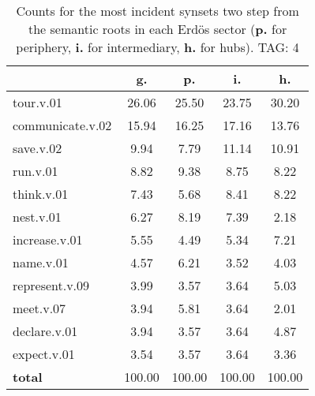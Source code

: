 \begin{table}[h!]
\begin{center}
\begin{tabular}{| l || c | c | c | c |}\hline
 & {\bf g.} & {\bf p.} & {\bf i.} & {\bf h.} \\\hline\hline
tour.v.01 & 26.06  & 25.50  & 23.75  & 30.20 \\\hline
communicate.v.02 & 15.94  & 16.25  & 17.16  & 13.76 \\\hline
save.v.02 & 9.94  & 7.79  & 11.14  & 10.91 \\\hline
run.v.01 & 8.82  & 9.38  & 8.75  & 8.22 \\\hline
think.v.01 & 7.43  & 5.68  & 8.41  & 8.22 \\\hline
nest.v.01 & 6.27  & 8.19  & 7.39  & 2.18 \\\hline
increase.v.01 & 5.55  & 4.49  & 5.34  & 7.21 \\\hline
name.v.01 & 4.57  & 6.21  & 3.52  & 4.03 \\\hline
represent.v.09 & 3.99  & 3.57  & 3.64  & 5.03 \\\hline
meet.v.07 & 3.94  & 5.81  & 3.64  & 2.01 \\\hline
declare.v.01 & 3.94  & 3.57  & 3.64  & 4.87 \\\hline
expect.v.01 & 3.54  & 3.57  & 3.64  & 3.36 \\\hline\hline
{{\bf total}} & 100.00  & 100.00  & 100.00  & 100.00 \\\hline
\end{tabular}
\caption{Counts for the most incident synsets two step from the semantic roots in each Erd\"os sector ({\bf p.} for periphery, {\bf i.} for intermediary, {\bf h.} for hubs). TAG: 4}
\end{center}
\end{table}